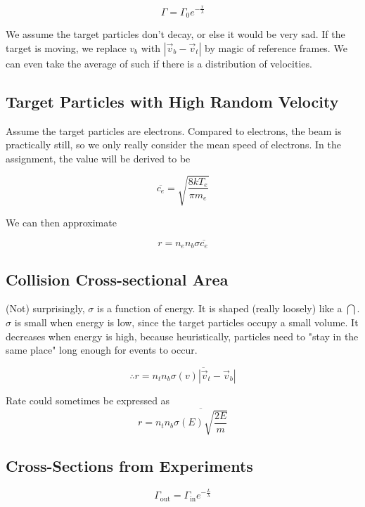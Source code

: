 \documentclass[12pt]{article}
\begin{document}
\begin{equation}
    \Gamma = \Gamma_0e^{-\frac{x}{\lambda}}
\end{equation}

We assume the target particles don't decay, or else it would be very sad. If the target is moving, we replace $v_b$ with $|\vec v_b - \vec v_t|$ by magic of reference frames. We can even take the average of such if there is a distribution of velocities.

\subsection{Target Particles with High Random Velocity}

Assume the target particles are electrons. Compared to electrons, the beam is practically still, so we only really consider the mean speed of electrons. In the assignment, the value will be derived to be

$$\overline{c_e} = \sqrt{\frac{8kT_e}{\pi m_e}}$$

We can then approximate

\begin{equation}
    r = n_en_b\sigma\overline{c_e}
\end{equation}

\subsection{Collision Cross-sectional Area}

(Not) surprisingly, $\sigma$ is a function of energy. It is shaped (really loosely) like a $\bigcap$. $\sigma$ is small when energy is low, since the target particles occupy a small volume. It decreases when energy is high, because heuristically, particles need to "stay in the same place" long enough for events to occur.

$$\therefore r = n_tn_b \overline{\sigma(v)|\vec v_t - \vec v_b|}$$

\begin{ex}
    Rate could sometimes be expressed as
    $$r = n_tn_b \overline{\sigma(E)\sqrt{\frac{2E}{m}}}$$
\end{ex}

\subsection{Cross-Sections from Experiments}

\begin{equation}
    \Gamma_{\text{out}} = \Gamma_{\text{in}} e^{-\frac{L}{\lambda}}
\end{equation}
\end{document}

